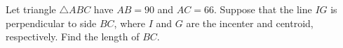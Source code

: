 Let triangle $\triangle{ABC}$ have $AB=90$ and $AC=66$. Suppose that the line $IG$ is perpendicular to side $BC$,  where $I$ and $G$ are the incenter and centroid, respectively. Find the length of $BC$.